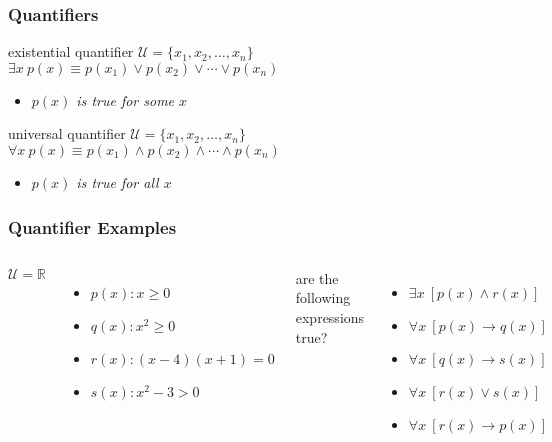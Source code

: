\documentclass[dvipsnames]{beamer}
\begin{document}
\begin{frame}
  \frametitle{Quantifiers}

  \begin{block}{existential quantifier}
    $\mathcal{U} = \{x_1,x_2,\ldots,x_n\}$\\
    $\exists x~p(x) \equiv p(x_1) \vee p(x_2) \vee \cdots \vee p(x_n)$

    \begin{itemize}
      \item \emph{$p(x)$ is true for some $x$}
    \end{itemize}
  \end{block}

  \pause
  \begin{block}{universal quantifier}
    $\mathcal{U} = \{x_1,x_2,\ldots,x_n\}$\\
    $\forall x~p(x) \equiv p(x_1) \wedge p(x_2) \wedge \cdots \wedge p(x_n)$

    \begin{itemize}
      \item \emph{$p(x)$ is true for all $x$}
    \end{itemize}
  \end{block}
\end{frame}

\begin{frame}
  \frametitle{Quantifier Examples}

  \begin{example}
    \begin{columns}[t]
      $\mathcal{U} = \mathbb{R}$\\

      \begin{itemize}
        \item $p(x): x \geq 0$
        \item $q(x): x^2 \geq 0$
        \item $r(x): (x-4) (x+1) = 0$
        \item $s(x): x^2 -3 > 0$
      \end{itemize}

      are the following expressions true?

      \begin{itemize}
        \pause
        \item $\exists x~[p(x) \wedge r(x)]$

        \pause
        \item $\forall x~[p(x) \rightarrow q(x)]$

        \pause
        \item $\forall x~[q(x) \rightarrow s(x)]$

        \pause
        \item $\forall x~[r(x) \vee s(x)]$

        \pause
        \item $\forall x~[r(x) \rightarrow p(x)]$
      \end{itemize}
    \end{columns}
  \end{example}
\end{frame}
\end{document}
